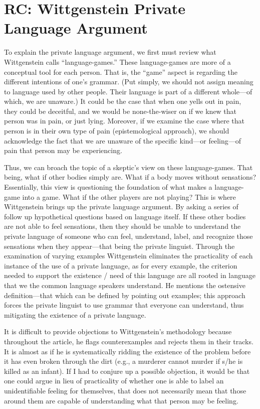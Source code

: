 \documentclass[11pt]{article}
\begin{document}
\setcounter{section}{1}
\section{RC: Wittgenstein Private Language Argument}

To explain the private language argument, we first must review what Wittgenstein calls ``language-games.'' These language-games are more of a conceptual tool for each person. That is, the ``game'' aspect is regarding the different intentions of one's grammar. (Put simply, we should not assign meaning to language used by other people. Their language is part of a different whole—of which, we are unaware.) It could be the case that when one yells out in pain, they could be deceitful, and we would be none-the-wiser on if we knew that person was in pain, or just lying. Moreover, if we examine the case where that person is in their own type of pain (epistemological approach), we should acknowledge the fact that we are unaware of the specific kind—or feeling—of pain that person may be experiencing.

Thus, we can broach the topic of a skeptic's view on these language-games. That being, what if other bodies simply are. What if a body moves without sensations? Essentially, this view is questioning the foundation of what makes a language-game into a game. What if the other players are not playing? This is where Wittgenstein brings up the private language argument. By asking a series of follow up hypothetical questions based on language itself. If these other bodies are not able to feel sensations, then they should be unable to understand the private language of someone who can feel, understand, label, and recognize those sensations when they appear—that being the private linguist. Through the examination of varying examples Wittgenstein eliminates the practicality of each instance of the use of a private language, as for every example, the criterion needed to support the existence / need of this language are all rooted in language that we the common language speakers understand. He mentions the ostensive definition—that which can be defined by pointing out examples; this approach forces the private linguist to use grammar that everyone can understand, thus mitigating the existence of a private language.

It is difficult to provide objections to Wittgenstein's methodology because throughout the article, he flags counterexamples and rejects them in their tracks. It is almost as if he is systematically ridding the existence of the problem before it has even broken through the dirt (e.g., a murderer cannot murder if s/he is killed as an infant). If I had to conjure up a possible objection, it would be that one could argue in lieu of practicality of whether one is able to label an unidentifiable feeling for themselves, that does not necessarily mean that those around them are capable of understanding what that person may be feeling. 
\end{document}
